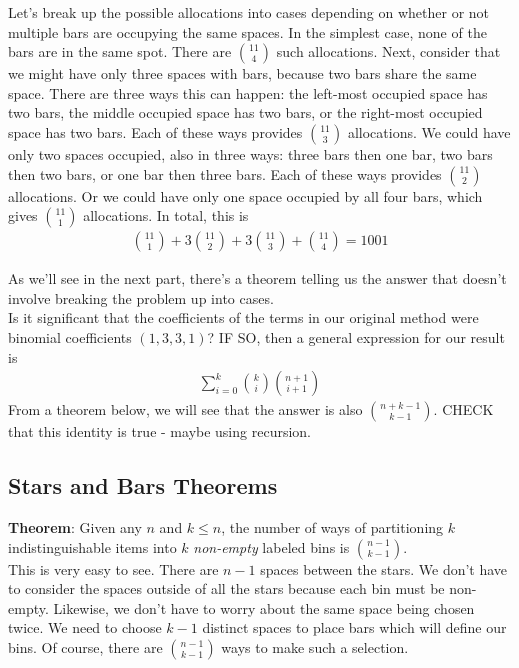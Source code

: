 Let's break up the possible allocations into cases depending on whether or not multiple bars are occupying the same spaces. In the simplest case, none of the bars are in the same spot. There are $\binom{11}{4}$ such allocations. Next, consider that we might have only three spaces with bars, because two bars share the same space. There are three ways this can happen: the left-most occupied space has two bars, the middle occupied space has two bars, or the right-most occupied space has two bars. Each of these ways provides $\binom{11}{3}$ allocations. We could have only two spaces occupied, also in three ways: three bars then one bar, two bars then two bars, or one bar then three bars. Each of these ways provides $\binom{11}{2}$ allocations. Or we could have only one space occupied by all four bars, which gives $\binom{11}{1}$ allocations. In total, this is
\begin{align*}
\binom{11}{1} + 3 \binom{11}{2} + 3 \binom{11}{3} + \binom{11}{4} = 1001
\end{align*}


As we'll see in the next part, there's a theorem telling us the answer that doesn't involve breaking the problem up into cases.\\

Is it significant that the coefficients of the terms in our original method were binomial coefficients $(1, 3, 3, 1)$? IF SO, then a general expression for our result is
\begin{align*}
\sum_{i=0}^k \binom{k}{i} \binom{n+1}{i+1}
\end{align*}
From a theorem below, we will see that the answer is also $\binom{n+k-1}{k-1}$. CHECK that this identity is true - maybe using recursion.

\subsection{Stars and Bars Theorems}
\textbf{Theorem}: Given any $n$ and $k \leq n$, the number of ways of partitioning $k$ indistinguishable items into $k$ \emph{non-empty} labeled bins is $\binom{n-1}{k-1}$.\\

This is very easy to see. There are $n-1$ spaces between the stars. We don't have to consider the spaces outside of all the stars because each bin must be non-empty. Likewise, we don't have to worry about the same space being chosen twice. We need to choose $k-1$ distinct spaces to place bars which will define our bins. Of course, there are $\binom{n-1}{k-1}$ ways to make such a selection.\\


